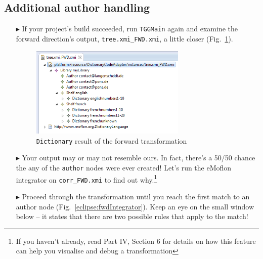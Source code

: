 \newpage
\hypertarget{t2m close}{}
\subsection{Additional author handling}
\genHeader

\begin{itemize}

\item[$\blacktriangleright$] If your project's build succeeded, run \texttt{TGGMain} again and examine the forward direction's output, 
\texttt{tree.xmi\_FWD.xmi}, a little closer (Fig.~\ref{eclipse:generatedFwdTrsfm}).

\vspace{0.5cm}

\begin{figure}[htbp]
\begin{center}
  \includegraphics[width=0.7\textwidth]{eclipse_generatedForwardTransformation}
  \caption{\texttt{Dictionary} result of the forward transformation}
  \label{eclipse:generatedFwdTrsfm}
\end{center}
\end{figure}

\vspace{0.5cm}

\item[$\blacktriangleright$] Your output may or may not resemble ours. In fact, there's a 50/50 chance the any of the \texttt{author} nodes were ever created!
Let's run the eMoflon integrator on \texttt{corr\_FWD.xmi} to find out why.\footnote{If you haven't already, read Part IV, Section 6 for details on how this feature
can help you visualise and debug a transformation}

\vspace{0.5cm}

\item[$\blacktriangleright$] Proceed through the transformation until you reach the first match to an author node (Fig.~\ref{eclipse:fwdIntegrator}). Keep an
eye on the small window below -- it states that there are two possible rules that apply to the match!


\end{itemize}

